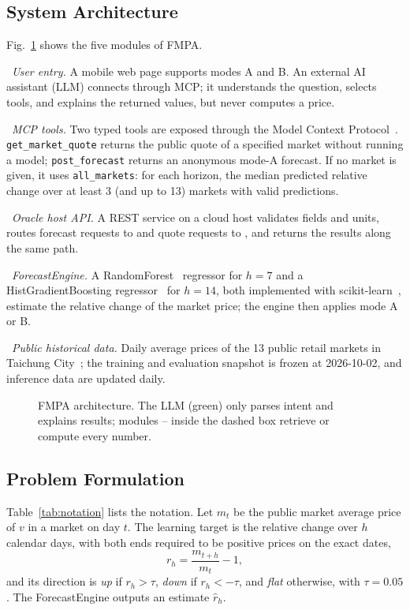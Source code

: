 \subsection{System Architecture}
Fig.~\ref{fig:architecture} shows the five modules of FMPA.

~\textit{User entry.} A mobile web page supports modes A and B. An
external AI assistant (LLM) connects through MCP; it understands the question,
selects tools, and explains the returned values, but never computes a price.

~\textit{MCP tools.} Two typed tools are exposed through the Model
Context Protocol~\cite{anthropic2024mcp}. \texttt{get\_market\_quote} returns
the public quote of a specified market without running a model;
\texttt{post\_forecast} returns an anonymous mode-A forecast. If no market is
given, it uses \texttt{all\_markets}: for each horizon, the median predicted
relative change over at least 3 (and up to 13) markets with valid predictions.

~\textit{Oracle host API.} A REST service on a cloud host validates
fields and units, routes forecast requests to  and quote requests to
, and returns the results along the same path.

~\textit{ForecastEngine.} A RandomForest~\cite{breiman2001random}
regressor for $h=7$ and a HistGradientBoosting regressor~\cite{ke2017lightgbm}
for $h=14$, both implemented with scikit-learn~\cite{pedregosa2011scikit},
estimate the relative change of the market price; the engine then applies
mode A or B.

~\textit{Public historical data.} Daily average prices of the 13
public retail markets in Taichung City~\cite{taichung2026retail}; the training
and evaluation snapshot is frozen at 2026-10-02, and inference data are updated
daily.

\begin{figure}[t]
\centering

\caption{FMPA architecture. The LLM (green) only parses intent and explains
results; modules -- inside the dashed box retrieve or compute
every number.}
\label{fig:architecture}
\end{figure}

\subsection{Problem Formulation}
Table~\ref{tab:notation} lists the notation. Let $m_t$ be the public market
average price of $v$ in a market on day $t$. The learning target is the
relative change over $h$ calendar days, with both ends required to be positive
prices on the exact dates,
\begin{equation}
r_h=\frac{m_{t+h}}{m_t}-1,
\label{eq:delta}
\end{equation}
and its direction is \emph{up} if $r_h>\tau$, \emph{down} if $r_h<-\tau$, and
\emph{flat} otherwise, with $\tau=0.05$. The ForecastEngine outputs an
estimate $\hat{r}_h$.

